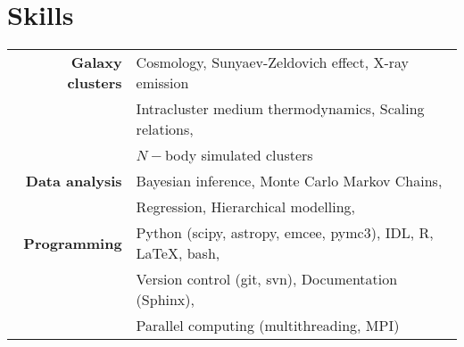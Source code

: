 \section{Skills}\label{skills}

\begin{table}[H]
    {\def\arraystretch{1.}\tabcolsep=5pt
        \begin{tabular}{r l}

    \textbf{Galaxy clusters}
        & Cosmology, Sunyaev-Zeldovich effect, X-ray emission \\
        & Intracluster medium thermodynamics, Scaling relations, \\
        & $N-$body simulated clusters \\[5pt]
    \textbf{Data analysis}
        & Bayesian inference, Monte Carlo Markov Chains, \\
        & Regression, Hierarchical modelling, \\[5pt]
    \textbf{Programming}
        & Python (scipy, astropy, emcee, pymc3), IDL, R, %
            \LaTeX, bash, \\
        & Version control (git, svn), Documentation (Sphinx), \\
        & Parallel computing (multithreading, MPI) \\

    \end{tabular}}
\end{table}
